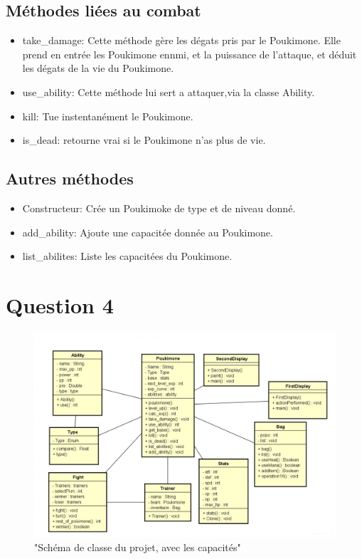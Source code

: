 \documentclass{report}
\begin{document}
\subsection*{Méthodes liées au combat}
\begin{itemize}
    \item{take\_damage:}
        Cette méthode gère les dégats pris par le Poukimone. Elle prend en entrée les Poukimone ennmi, et la puissance de l'attaque, et déduit les dégats de la vie du Poukimone.\\
    \item{use\_ability:}
        Cette méthode lui sert a attaquer,via la classe Ability.\\
    \item{kill:}
        Tue instentanément le Poukimone.\\
    \item{is\_dead:}
        retourne vrai si le Poukimone n'as plus de vie.
\end{itemize}
\subsection*{Autres méthodes}
\begin{itemize}
    \item{Constructeur:}
        Crée un Poukimoke de type et de niveau donné.\\
    \item{add\_ability:}
        Ajoute une capacitée donnée au Poukimone.\\
    \item{list\_abilites:}
        Liste les capacitées du Poukimone.
\end{itemize}
\section*{Question 4}
\begin{figure}[ht!]
    \centering
    \includegraphics[width=125mm]{Q4.png}
    \caption{"Schéma de classe du projet, avec les capacités"}
\end{figure}
\end{document}

